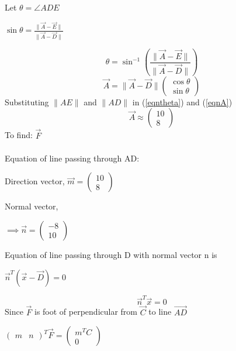 \documentclass[letterpaper,12pt]{article}
\begin{document}
Let $\theta = \angle ADE$
\begin{center}
    $\sin \theta = \frac{\|\Vec{A}-\Vec{E}\|}{\|\Vec{A}-\Vec{D}\|}$
\end{center}
\begin{equation}
    \theta = \sin^{-1}\left(\frac{\|\Vec{A}-\Vec{E}\|}{\|\Vec{A}-\Vec{D}\|}\right)
\label{eqntheta}
\end{equation}
\begin{equation}
    \Vec{A} = \|\Vec{A}-\Vec{D}\|\begin{pmatrix} \cos \theta \\ \sin \theta \end{pmatrix}
\label{eqnA}
\end{equation}
Substituting $\|AE\|$ and $\|AD\|$ in (\ref*{eqntheta}) and (\ref*{eqnA})
\begin{equation}
    \Vec{A} \approx \begin{pmatrix} 10 \\ 8 \end{pmatrix}
\end{equation}
To find: $\Vec{F}$ \\ \\
Equation of line passing through AD:
\begin{center}
    Direction vector, $\Vec{m} = \begin{pmatrix} 10 \\ 8 \end{pmatrix}$
\end{center}
Normal vector,
\begin{center}
    $\implies \Vec{n} = \begin{pmatrix} -8 \\ 10 \end{pmatrix}$
\end{center}
Equation of line passing through D with normal vector n is
\begin{center}
    $\Vec{n}^T(\Vec{x} - \Vec{D}) = 0$
\end{center}
\begin{equation}
    \Vec{n}^T\Vec{x} = 0
\end{equation}
Since $\Vec{F}$ is foot of perpendicular from $\Vec{C}$ to line $\Vec{AD}$
\begin{center}
    $\begin{pmatrix}m & n\end{pmatrix}^T\Vec{F} = \begin{pmatrix} m^TC \\ 0 \end{pmatrix}$
\end{center}
\end{document}
